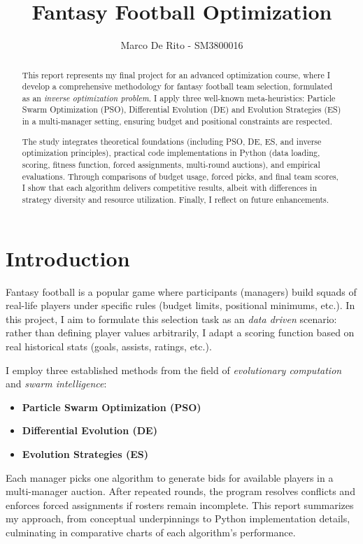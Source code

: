 \documentclass[sigconf]{acmart}
\title{Fantasy Football Optimization}
\author{Marco De Rito - SM3800016}
\affiliation{
	\institution{University of Trieste}
	\city{Trieste}
	\country{Italy}
}
\begin{document}
	\sloppy
	\begin{abstract}
		This report represents my final project for an advanced optimization course, where I develop a comprehensive methodology for fantasy football team selection, formulated as an \emph{inverse optimization problem}. I apply three well-known meta-heuristics: Particle Swarm Optimization (PSO), Differential Evolution (DE) and Evolution Strategies (ES) in a multi-manager setting, ensuring budget and positional constraints are respected.
		
		The study integrates theoretical foundations (including PSO, DE, ES, and inverse optimization principles), practical code implementations in Python (data loading, scoring, fitness function, forced assignments, multi-round auctions), and empirical evaluations. Through comparisons of budget usage, forced picks, and final team scores, I show that each algorithm delivers competitive results, albeit with differences in strategy diversity and resource utilization. Finally, I reflect on future enhancements.
	\end{abstract}
	
	
	\maketitle
	
	\section{Introduction}
	Fantasy football is a popular game where participants (managers) build squads of real-life players under specific rules (budget limits, positional minimums, etc.). In this project, I aim to formulate this selection task as an \emph{data driven} scenario: rather than defining player values arbitrarily, I adapt a scoring function based on real historical stats (goals, assists, ratings, etc.).
	
	I employ three established methods from the field of \emph{evolutionary computation} and \emph{swarm intelligence}:
	\begin{itemize}
		\item \textbf{Particle Swarm Optimization (PSO)}
		\item \textbf{Differential Evolution (DE)}
		\item \textbf{Evolution Strategies (ES)}
	\end{itemize}
	Each manager picks one algorithm to generate bids for available players in a multi-manager auction. After repeated rounds, the program resolves conflicts and enforces forced assignments if rosters remain incomplete. This report summarizes my approach, from conceptual underpinnings to Python implementation details, culminating in comparative charts of each algorithm’s performance.
	
\end{document}
